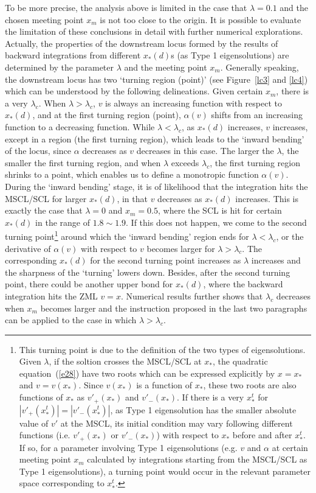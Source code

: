 \documentclass[fleqn,usenatbib]{mnras}
\begin{document}
To be more precise, the analysis above is limited in the case that $\lambda=0.1$ and the chosen meeting point $x_{m}$ is not too close to the origin. It is possible to evaluate the limitation of these conclusions in detail with further numerical explorations. Actually, the properties of the downstream locus formed by the results of backward integrations from different $x_{*}(d)$s (as Type 1 eigensolutions) are determined by the parameter $\lambda$ and the meeting point $x_{m}$. Generally speaking, the downstream locus has two `turning region (point)' (see Figure~\ref{lc3} and \ref{lc4}) which can be understood by the following delineations. Given certain $x_{m}$, there is a very $\lambda_{c}$. When $\lambda>\lambda_{c}$, $v$ is always an increasing function with respect to $x_{*}(d)$, and at the first turning region (point), $\alpha(v)$ shifts from an increasing function to a decreasing function. While $\lambda<\lambda_{c}$, as $x_{*}(d)$ increases, $v$ increases, except in a region (the first turning region), which leads to the `inward bending' of the locus, since $\alpha$ decreases as $v$ decreases in this case. The larger the $\lambda$, the smaller the first turning region, and when $\lambda$ exceeds $\lambda_{c}$, the first turning region shrinks to a point, which enables us to define a monotropic function $\alpha(v)$. During the `inward bending'
stage, it is of likelihood that the integration hits the MSCL/SCL for larger $x_{*}(d)$, in that $v$ decreases as $x_{*}(d)$ increases. This is exactly the case that $\lambda=0$ and $x_{m}=0.5$, where the SCL is hit for certain $x_{*}(d)$ in the range of $1.8\sim 1.9$. If this does not happen, we come to the second turning point\footnote{This turning point is due to the definition of the two types of eigensolutions. Given $\lambda$, if the soltion crosses the MSCL/SCL at $x_{*}$, the quadratic equation~(\ref{e28}) have two roots which can be expressed explicitly by $x=x_{*}$ and $v=v(x_{*})$. Since $v(x_{*})$ is a function of $x_{*}$, these two roots are also functions of $x_{*}$ as $v'_{+}(x_{*})$ and $v'_{-}(x_{*})$. If there is a very $x_{*}^{t}$ for $|v'_{+}(x_{*}^{t})|=|v'_{-}(x_{*}^{t})|$, as Type 1 eigensolution has the smaller absolute value of $v'$ at the MSCL, its initial condition may vary following different functions (i.e. $v'_{+}(x_{*})$ or $v'_{-}(x_{*})$) with respect to $x_{*}$ before and after $x_{*}^{t}$. If so, for a parameter involving Type 1 eigensolutions (e.g. $v$ and $\alpha$ at certain meeting point $x_{m}$ calculated by integrations starting from the MSCL/SCL as Type 1 eigensolutions), a turning point would occur in the relevant parameter space corresponding to $x_{*}^{t}$.\label{f1}} around which the `inward bending' region ends for $\lambda<\lambda_{c}$, or the derivative of $\alpha(v)$ with respect to $v$ becomes larger for $\lambda>\lambda_{c}$. The corresponding $x_{*}(d)$ for the second turning point increases as $\lambda$ increases and the sharpness of the `turning' lowers down. Besides, after the second turning point, there could be another upper bond for $x_{*}(d)$, where the backward integration hits the ZML $v=x$. Numerical results further shows that $\lambda_{c}$ decreases when $x_{m}$ becomes larger and the instruction proposed in the last two paragraphs can be applied to the case in which $\lambda>\lambda_{c}$. 
\end{document}
